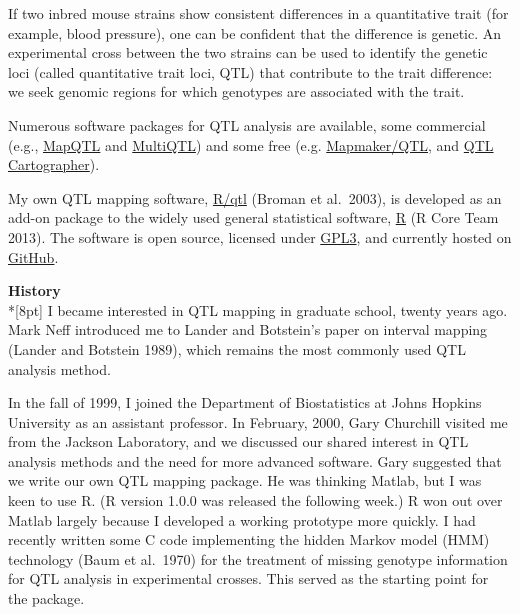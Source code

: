 \documentclass[letterpaper]{article}
\begin{document}
\begin{multicols}{2}
If two inbred mouse strains show consistent differences in a
quantitative trait (for example, blood pressure), one can be confident
that the difference is genetic. An experimental cross between the two
strains can be used to identify the genetic loci (called quantitative
trait loci, QTL) that contribute to the trait difference: we seek
genomic regions for which genotypes are associated with the trait.

Numerous software packages for QTL analysis are available, some
commercial (e.g.,
\href{http://www.kyazma.nl/index.php/mc.MapQTL}{MapQTL} and
\href{http://www.multiqtl.com}{MultiQTL}) and some free
(e.g. \href{http://www.broadinstitute.org/ftp/distribution/software/mapmaker3}{Mapmaker/QTL},
and \href{http://statgen.ncsu.edu/qtlcart/index.php}{QTL
Cartographer}).

My own QTL mapping software, \href{http://www.rqtl.org}{R/qtl} (Broman
et al.\ 2003), is developed as an add-on package to the widely used
general statistical software, \href{http://www.r-project.org}{R} (R
Core Team 2013). The software is open source, licensed under
\href{http://www.gnu.org/licenses/gpl.html}{GPL3}, and currently
hosted on \href{http://github.com/kbroman/qtl.git}{GitHub}.




\bigskip
{}
\noindent \textbf{\sffamily History}\\*[8pt]
I became interested in QTL mapping in graduate school, twenty years ago.
Mark Neff introduced me to Lander and Botstein's
paper on interval mapping (Lander and Botstein 1989), which remains
the most commonly used QTL analysis method.

In the fall of 1999, I joined the Department of Biostatistics at Johns
Hopkins University as an assistant professor. In February, 2000, Gary
Churchill visited me from the Jackson Laboratory, and we discussed our
shared interest in QTL analysis methods and the need for more advanced
software. Gary suggested that we write our own QTL mapping package. He
was thinking Matlab, but I was keen to use R. (R version 1.0.0 was
released the following week.) R won out over Matlab largely because I
developed a working prototype more quickly. I had recently written
some C code implementing the hidden Markov model (HMM) technology (Baum et
al.\ 1970) for the treatment of missing genotype information for QTL
analysis in experimental crosses.  This served as the starting point
for the package.


\end{multicols}
\end{document}
